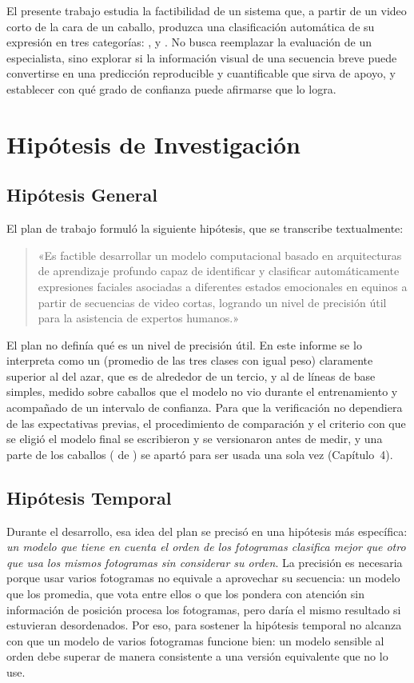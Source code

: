 El presente trabajo estudia la factibilidad de un sistema que, a partir de un video corto de la cara de un caballo, produzca una clasificación automática de su expresión en tres categorías: ,  y . No busca reemplazar la evaluación de un especialista, sino explorar si la información visual de una secuencia breve puede convertirse en una predicción reproducible y cuantificable que sirva de apoyo, y establecer con qué grado de confianza puede afirmarse que lo logra.

\section{Hipótesis de Investigación}
\subsection{Hipótesis General}
El plan de trabajo formuló la siguiente hipótesis, que se transcribe textualmente:

\begin{quote}
«Es factible desarrollar un modelo computacional basado en arquitecturas de aprendizaje profundo capaz de identificar y clasificar automáticamente expresiones faciales asociadas a diferentes estados emocionales en equinos a partir de secuencias de video cortas, logrando un nivel de precisión útil para la asistencia de expertos humanos.»
\end{quote}

El plan no definía qué es un nivel de precisión útil. En este informe se lo interpreta como un \fmacro{} (promedio de las tres clases con igual peso) claramente superior al del azar, que es de alrededor de un tercio, y al de líneas de base simples, medido sobre caballos que el modelo no vio durante el entrenamiento y acompañado de un intervalo de confianza. Para que la verificación no dependiera de las expectativas previas, el procedimiento de comparación y el criterio con que se eligió el modelo final se escribieron y se versionaron antes de medir, y una parte de los caballos (\CaballosReserva{} de \CaballosTotal{}) se apartó para ser usada una sola vez (Capítulo~4).

\subsection{Hipótesis Temporal}
Durante el desarrollo, esa idea del plan se precisó en una hipótesis más específica: \textit{un modelo que tiene en cuenta el orden de los fotogramas clasifica mejor que otro que usa los mismos fotogramas sin considerar su orden}. La precisión es necesaria porque usar varios fotogramas no equivale a aprovechar su secuencia: un modelo que los promedia, que vota entre ellos o que los pondera con atención sin información de posición procesa los fotogramas, pero daría el mismo resultado si estuvieran desordenados. Por eso, para sostener la hipótesis temporal no alcanza con que un modelo de varios fotogramas funcione bien: un modelo sensible al orden debe superar de manera consistente a una versión equivalente que no lo use.

